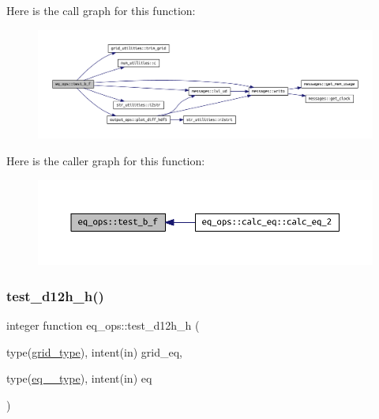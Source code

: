 Here is the call graph for this function\+:\nopagebreak
\begin{figure}[H]
\begin{center}
\leavevmode
\includegraphics[width=350pt]{namespaceeq__ops_a8082c12510696bd8ffdd0deef41860c2_cgraph}
\end{center}
\end{figure}
Here is the caller graph for this function\+:\nopagebreak
\begin{figure}[H]
\begin{center}
\leavevmode
\includegraphics[width=350pt]{namespaceeq__ops_a8082c12510696bd8ffdd0deef41860c2_icgraph}
\end{center}
\end{figure}
\mbox{\label{namespaceeq__ops_a003df1e1ab90dc6f586c3eed3dd067e8}} 
\subsubsection{\texorpdfstring{test\+\_\+d12h\+\_\+h()}{test\_d12h\_h()}}
{\footnotesize\ttfamily integer function eq\+\_\+ops\+::test\+\_\+d12h\+\_\+h (\begin{DoxyParamCaption}\item[{type(\hyperlink{structgrid__vars_1_1grid__type}{grid\+\_\+type}), intent(in)}]{grid\+\_\+eq,  }\item[{type(\hyperlink{structeq__vars_1_1eq__2__type}{eq\+\_\+2\+\_\+type}), intent(in)}]{eq }\end{DoxyParamCaption})}



